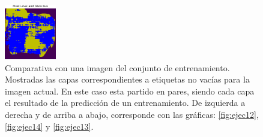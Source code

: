 \begin{figure}[h!]
  \vrule
  \includegraphics[width=0.2\textwidth]{../../modelos-entrenados/unet-semconv-conv/ejecucion13/predtrainmid6}
  \caption{Comparativa con una imagen del conjunto de entrenamiento. Mostradas las capas correspondientes a etiquetas no vacías para la imagen actual. En este caso esta partido en pares, siendo cada capa el resultado de la predicción de un entrenamiento. De izquierda a derecha y de arriba a abajo, corresponde con las gráficas: \autoref{fig:ejec12}, \autoref{fig:ejec14} y \autoref{fig:ejec13}.}
  \label{fig:comparativa2-train}
\end{figure}

